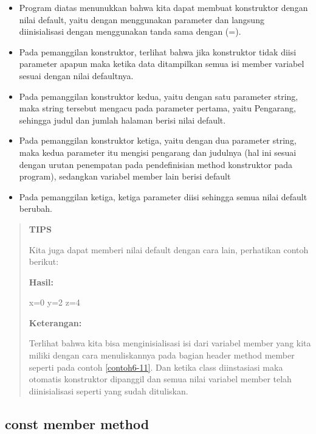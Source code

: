\begin{itemize}

\item
 Program diatas menunukkan bahwa kita dapat membuat konstruktor dengan
 nilai default, yaitu dengan menggunakan parameter dan langsung
 diinisialisasi dengan menggunakan tanda sama dengan (=).
\item
 Pada pemanggilan konstruktor, terlihat bahwa jika konstruktor tidak
 diisi parameter apapun maka ketika data ditampilkan semua isi member
 variabel sesuai dengan nilai defaultnya.
\item
 Pada pemanggilan konstruktor kedua, yaitu dengan satu parameter
 string, maka string tersebut mengacu pada parameter pertama, yaitu
 Pengarang, sehingga judul dan jumlah halaman berisi nilai default.
\item
 Pada pemanggilan konstruktor ketiga, yaitu dengan dua parameter
 string, maka kedua parameter itu mengisi pengarang dan judulnya (hal
 ini sesuai dengan urutan penempatan pada pendefinisian method
 konstruktor pada program), sedangkan variabel member lain berisi
 default
\item
 Pada pemanggilan ketiga, ketiga parameter diisi sehingga semua nilai
 default berubah.
\end{itemize}
\begin{quotation}
{\LARGE {}} \textbf{TIPS}

	Kita juga
	dapat memberi nilai default dengan cara lain, perhatikan contoh berikut:



	\textbf{Hasil:}

\begin{lcverbatim}
x=0 y=2 z=4
\end{lcverbatim}

	\textbf{Keterangan:}

	Terlihat bahwa kita bisa menginisialisasi isi dari variabel member yang
	kita miliki dengan cara menuliskannya pada bagian header method member
	seperti pada contoh \ref{contoh6-11}. Dan ketika class diinstasiasi maka otomatis
	konstruktor dipanggil dan semua nilai variabel member telah
	diinisialisasi seperti yang sudah dituliskan.
\end{quotation}


\subsection{const member method}\label{const-member-method}

